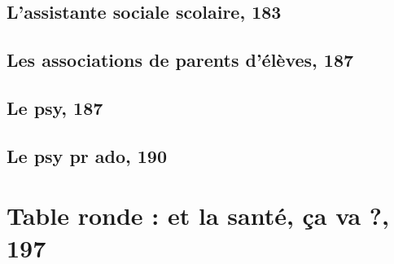 \documentclass[12pt]{report}
\begin{document}
\begin{itemize}
\section{L'assistante sociale scolaire, 183}
\section{Les associations de parents d'élèves, 187}
\section{Le psy, 187}
\section{Le psy pr ado, 190}

\chapter{Table ronde : et la santé, ça va ?, 197}


















\end{itemize}
\end{document}
